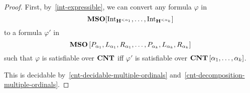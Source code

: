 \begin{proof}
  First, by~\cref{int-expressible}, we can convert
  any formula $\varphi$ in \[
    \mathbf{MSO}[\mathrm{Int}_{\mathbf{H}^{< \alpha_1}}, \ldots, \mathrm{Int}_{\mathbf{H}^{< \alpha_k}}]
  \]
  to a formula $\varphi'$ in \[
    \mathbf{MSO} \left[ {P_{\alpha_1}, L_{\alpha_1}, R_{\alpha_1}, \ldots, P_{\alpha_k}, L_{\alpha_k}, R_{\alpha_k}} \right]
  \]
  such that $\varphi$ is satisfiable over $\mathbf{CNT}$
  iff $\varphi'$ is satisfiable over $\mathbf{CNT} \left[ {\alpha_1, \ldots, \alpha_k} \right]$.

  This is decidable by~\cref{cnt-decidable-multiple-ordinals} and~\cref{cnt-decomposition-multiple-ordinals}.
\end{proof}